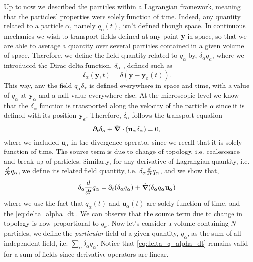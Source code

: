 Up to now we described the particles within a Lagrangian framework, meaning that the particles' properties were solely function of time.
Indeed, any quantity related to a particle $\alpha$, namely $q_\alpha(t)$, isn't defined though space.
In continuous mechanics we wish to transport fields defined at any point \textbf{y} in space, so that we are able to average a quantity over several particles contained in a given volume of space.
Therefore, we define the field quantity related  to $q_\alpha$ by, $\delta_\alpha q_\alpha$, where we introduced the Dirac delta function, $\delta_\alpha$ \citep{morel2015mathematical}, defined such as
\begin{equation}
    \delta_\alpha(\textbf{y},t) = \delta(\textbf{y}-\textbf{y}_\alpha(t)).
\end{equation}
This way, any the field $q_\alpha \delta_\alpha$ is defined everywhere in space and time, with a value of $q_\alpha$ at $\textbf{y}_\alpha$ and a null value everywhere else.
At the microscopic level we know that the $\delta_\alpha$ function is transported along the velocity of the particle $\alpha$ since it is defined with its position $\textbf{y}_\alpha$.
Therefore, $\delta_\alpha$ follows the transport equation
\begin{equation}
    \partial_t \delta_\alpha
    + \hat{\bm{\nabla}} \cdot (\textbf{u}_\alpha  \delta_\alpha)
    =0,
    \label{eq:delta_alpha_dt}
\end{equation}
where we included $\textbf{u}_\alpha$ in the divergence operator since we recall that it is solely function of time.
The source term is due to change of topology, i.e. coalescence and break-up of particles.
Similarly, for any derivative of Lagrangian quantity, i.e. $\frac{d}{d t} q_\alpha$, we define its related field quantity, i.e. $\delta_\alpha \frac{d}{d t} q_\alpha$, and we show that,
\begin{equation}
    \delta_\alpha \frac{d}{d t} q_\alpha
    = \partial_t (\delta_\alpha q_\alpha)
    + \hat{\bm{\nabla}} (\delta_\alpha q_\alpha \textbf{u}_\alpha)
    \label{eq:delta_q_alpha_dt}
\end{equation}
where we use the fact that $q_\alpha(t)$ and $\textbf{u}_\alpha(t)$ are solely function of time, and the \ref{eq:delta_alpha_dt}.
We can observe that the source term due to change in topology is now proportional to $q_\alpha$.
Now let's consider a volume containing $N$ particles, we define the \textit{particular} field of a given quantity, $q_\alpha$, as the sum of all independent field, i.e. $\sum_\alpha \delta_\alpha q_\alpha$.
Notice that \ref{eq:delta_q_alpha_dt} remains valid for a sum of fields since derivative operators are linear.



